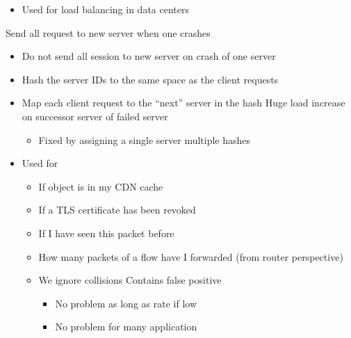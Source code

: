 \begin{itemize}
\begin{itemize}
\begin{itemize}
\begin{itemize}
                            \item Used for load balancing in data centers
                        \end{itemize}
                    \icon Send all request to new server when one crashes
                \end{itemize}
                \begin{itemize}
                    \item Do not send all session to new server on crash of one server
                    \item Hash the server IDs to the same space as the client requests
                    \item Map each client request to the ``next'' server in the hash
                    \icon Huge load increase on successor server of failed server
                        \begin{itemize}
                            \item Fixed by assigning a single server multiple hashes
                        \end{itemize}
                \end{itemize}
        \end{itemize}
        \begin{itemize}
            \item Used for
                \begin{itemize}
                    \item If object is in my CDN cache
                    \item If a TLS certificate has been revoked
                    \item If I have seen this packet before
                    \item How many packets of a flow have I forwarded (from router perspective)
                \end{itemize}
                \begin{itemize}
                    \item We ignore collisions
                    \icon Contains false positive
                        \begin{itemize}
                            \item No problem as long as rate if low
                            \item No problem for many application

\end{itemize}
\end{itemize}
\end{itemize}
\end{itemize}
